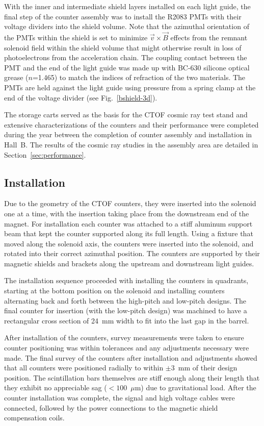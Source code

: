 \documentclass[3p,times,twocolumn]{elsarticle}
\begin{document}
With the inner and intermediate shield layers installed on each light guide, the final step of the counter
assembly was to install the R2083 PMTs with their voltage dividers into the shield volume. Note that the
azimuthal orientation of the PMTs within the shield is set to minimize $\vec{v} \times \vec{B}$ effects from
the remnant solenoid field within the shield volume that might otherwise result in loss of photoelectrons from
the acceleration chain. The coupling contact between the PMT and the end of the light guide was made up with
BC-630 silicone optical grease ($n$=1.465) to match the indices of refraction of the two materials. The PMTs
are held against the light guide using pressure from a spring clamp at the end of the voltage divider (see
Fig.~\ref{bshield-3d}).

The storage carts served as the basis for the CTOF cosmic ray test stand and extensive characterizations of
the counters and their performance were completed during the year between the completion of counter
assembly and installation in Hall~B. The results of the cosmic ray studies in the assembly area are detailed in
Section~\ref{sec:performance}.

\subsection{Installation}
\label{installation}

Due to the geometry of the CTOF counters, they were inserted into the solenoid one at a time, with the insertion
taking place from the downstream end of the magnet. For installation each counter was attached to a stiff
aluminum support beam that kept the counter supported along its full length. Using a fixture that moved along
the solenoid axis, the counters were inserted into the solenoid, and rotated into their correct azimuthal position.
The counters are supported by their magnetic shields and brackets along the upstream and downstream light
guides. 

The installation sequence proceeded with installing the counters in quadrants, starting at the bottom position on
the solenoid and installing counters alternating back and forth between the high-pitch and low-pitch designs. The
final counter for insertion (with the low-pitch design) was machined to have a rectangular cross section of 24~mm
width to fit into the last gap in the barrel.

After installation of the counters, survey measurements were taken to ensure counter positioning was within
tolerances and any adjustments necessary were made. The final survey of the counters after installation and
adjustments showed that all counters were positioned radially to within $\pm$3~mm of their design position.
The scintillation bars themselves are stiff enough along their length that they exhibit no appreciable sag
($< 100$~$\mu$m) due to gravitational load. After the counter installation was complete, the signal and
high voltage cables were connected, followed by the power connections to the magnetic shield compensation
coils.
\end{document}
